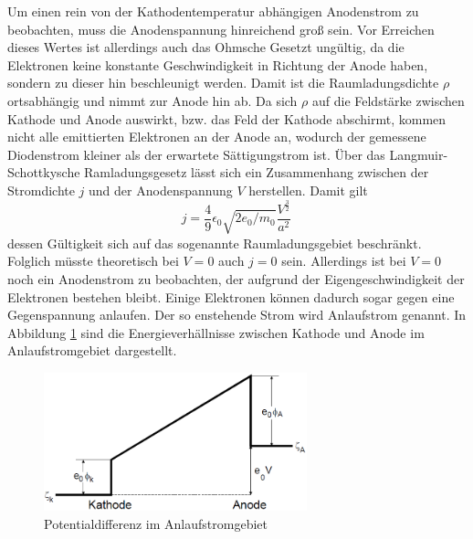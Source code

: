 \FloatBarrier
Um einen rein von der Kathodentemperatur abhängigen Anodenstrom zu beobachten, muss die Anodenspannung hinreichend groß sein. Vor Erreichen dieses 
Wertes ist allerdings auch das Ohmsche Gesetzt ungültig, da die Elektronen keine konstante Geschwindigkeit in Richtung der Anode haben, sondern 
zu dieser hin beschleunigt werden. Damit ist die Raumladungsdichte $\rho$ ortsabhängig und nimmt zur Anode hin ab. Da sich $\rho$ auf die 
Feldstärke zwischen Kathode und Anode auswirkt, bzw. das Feld der Kathode abschirmt, kommen nicht alle emittierten Elektronen an der Anode an,
wodurch der gemessene Diodenstrom kleiner als der erwartete Sättigungstrom ist. Über das Langmuir-Schottkysche Ramladungsgesetz lässt sich ein 
Zusammenhang zwischen der Stromdichte $j$ und der Anodenspannung $V$ herstellen. Damit gilt 
\begin{equation}
    j = \frac{4}9 \epsilon_0 \sqrt{2e_0/m_0} \frac{V^{\frac{3}2}}{a^2}\,
    \label{eqn:langmuir}
\end{equation}
dessen Gültigkeit sich auf das sogenannte Raumladungsgebiet beschränkt. Folglich müsste theoretisch bei $V=0$ auch $j=0$ sein. Allerdings 
ist bei $V=0$ noch ein Anodenstrom zu beobachten, der aufgrund der Eigengeschwindigkeit der Elektronen bestehen bleibt. Einige Elektronen 
können dadurch sogar gegen eine Gegenspannung anlaufen. Der so enstehende Strom wird Anlaufstrom genannt. In Abbildung \ref{fig:anlauf} sind 
die Energieverhällnisse zwischen Kathode und Anode im Anlaufstromgebiet dargestellt. 
\begin{figure}
    \centering
    \includegraphics[height=4cm]{data/potdiff.png}
    \caption{Potentialdifferenz im Anlaufstromgebiet}
    \label{fig:anlauf}
\end{figure}
\FloatBarrier

